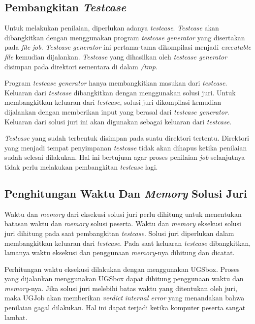 \subsection{Pembangkitan \textit{Testcase}}

\par Untuk melakukan penilaian, diperlukan adanya \textit{testcase}. \textit{Testcase} akan dibangkitkan dengan menggunakan program \textit{testcase generator} yang disertakan pada \textit{file} \textit{job}. \textit{Testcase generator} ini pertama-tama dikompilasi menjadi \textit{executable file} kemudian dijalankan. \textit{Testcase} yang dihasilkan oleh \textit{testcase generator} disimpan pada direktori sementara di dalam \textit{/tmp}.


\par Program \textit{testcase generator} hanya membangkitkan masukan dari \textit{testcase}. Keluaran dari \textit{testcase} dibangkitkan dengan menggunakan solusi juri. Untuk membangkitkan keluaran dari \textit{testcase}, solusi juri dikompilasi kemudian dijalankan dengan memberikan input yang berasal dari \textit{testcase generator}. Keluaran dari solusi juri ini akan digunakan sebagai keluaran dari \textit{testcase}.

\par \textit{Testcase} yang sudah terbentuk disimpan pada suatu direktori tertentu. Direktori yang menjadi tempat penyimpanan \textit{testcase} tidak akan dihapus ketika penilaian sudah selesai dilakukan. Hal ini bertujuan agar proses penilaian \textit{job} selanjutnya tidak perlu melakukan pembangkitan \textit{testcase} lagi.

\subsection{Penghitungan Waktu Dan \textit{Memory} Solusi Juri} 

\par Waktu dan \textit{memory} dari eksekusi solusi juri perlu dihitung untuk menentukan batasan waktu dan \textit{memory} solusi peserta. Waktu dan \textit{memory} eksekusi solusi juri dihitung pada saat pembangkitan \textit{testcase}. Solusi juri diperlukan dalam membangkitkan keluaran dari \textit{testcase}. Pada saat keluaran \textit{testcase} dibangkitkan, lamanya waktu eksekusi dan penggunaan \textit{memory}-nya dihitung dan dicatat.

\par Perhitungan waktu eksekusi dilakukan dengan menggunakan UGSbox. Proses yang dijalankan menggunakan UGSbox dapat dihitung penggunaan waktu dan \textit{memory}-nya. Jika solusi juri melebihi batas waktu yang ditentukan oleh juri, maka UGJob akan memberikan \textit{verdict} \textit{internal error} yang menandakan bahwa penilaian gagal dilakukan. Hal ini dapat terjadi ketika komputer peserta sangat lambat.

